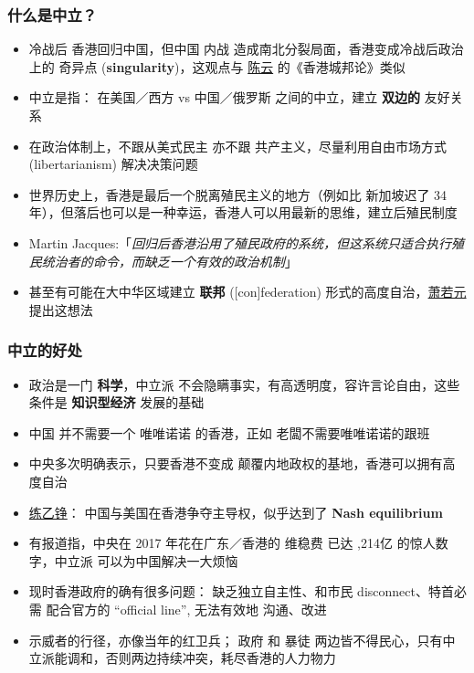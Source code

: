 \documentclass[10pt]{beamer}
\newcommand{\emp}[1]{{\color{blue}\textbf{#1}}}
\begin{document}
\begin{frame}
\frametitle{什么是中立？}
\begin{itemize}
	\item 冷战后 香港回归中国，但中国 内战 造成南北分裂局面，香港变成冷战后政治上的 奇异点 (\emp{singularity})，这观点与 \underline{陈云} 的《香港城邦论》类似

	\item 中立是指： 在美国／西方 vs 中国／俄罗斯 之间的中立，建立 \emp{双边的} 友好关系
	
	\item 在政治体制上，不跟从美式民主 亦不跟 共产主义，尽量利用自由市场方式 (libertarianism) 解决决策问题

	\item 世界历史上，香港是最后一个脱离殖民主义的地方（例如比 新加坡迟了 34 年），但落后也可以是一种幸运，香港人可以用最新的思维，建立后殖民制度

	\item Martin Jacques:「\textit{回归后香港沿用了殖民政府的系统，但这系统只适合执行殖民统治者的命令，而缺乏一个有效的政治机制}」

	\item 甚至有可能在大中华区域建立 \emp{联邦} ([con]federation) 形式的高度自治，\underline{萧若元} 提出这想法
\end{itemize}
\end{frame}

\begin{frame}
\frametitle{中立的好处}
\begin{itemize}
	\item 政治是一门 \emp{科学}，中立派 不会隐瞒事实，有高透明度，容许言论自由，这些条件是 \emp{知识型经济} 发展的基础
	
	\item 中国 并不需要一个 唯唯诺诺 的香港，正如 老闆不需要唯唯诺诺的跟班
	
	\item 中央多次明确表示，只要香港不变成 颠覆内地政权的基地，香港可以拥有高度自治
	
	\item \underline{练乙铮}： 中国与美国在香港争夺主导权，似乎达到了 \emp{Nash equilibrium}

	\item 有报道指，中央在 2017 年花在广东／香港的 维稳费 已达 ,214亿 的惊人数字，中立派 可以为中国解决一大烦恼

	\item 现时香港政府的确有很多问题： 缺乏独立自主性、和市民 disconnect、特首必需 配合官方的 ``official line'', 无法有效地 沟通、改进

	\item 示威者的行径，亦像当年的红卫兵； 政府 和 暴徒 两边皆不得民心，只有中立派能调和，否则两边持续冲突，耗尽香港的人力物力

\end{itemize}
\end{frame}
\end{document}
